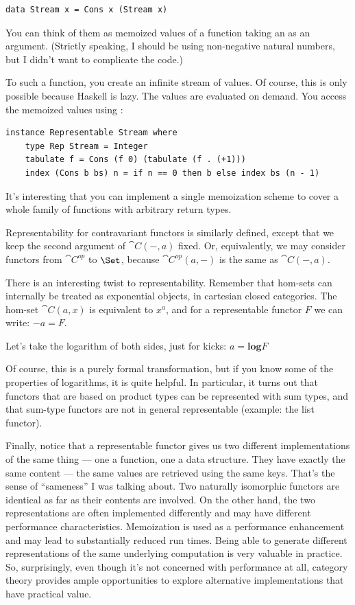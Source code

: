 \begin{Verbatim}
data Stream x = Cons x (Stream x)
\end{Verbatim}
You can think of them as memoized values of a function taking an
 as an argument. (Strictly speaking, I should be using
non-negative natural numbers, but I didn't want to complicate the code.)

To  such a function, you create an infinite stream of
values. Of course, this is only possible because Haskell is lazy. The
values are evaluated on demand. You access the memoized values using
:

\begin{Verbatim}
instance Representable Stream where
    type Rep Stream = Integer
    tabulate f = Cons (f 0) (tabulate (f . (+1)))
    index (Cons b bs) n = if n == 0 then b else index bs (n - 1)
\end{Verbatim}
It's interesting that you can implement a single memoization scheme to
cover a whole family of functions with arbitrary return types.

Representability for contravariant functors is similarly defined, except
that we keep the second argument of $\cat{C}(-, a)$ fixed. Or,
equivalently, we may consider functors from $\cat{C}^{op}$
to $\Set$, because $\cat{C}^{op}(a, -)$ is the same as
$\cat{C}(-, a)$.

There is an interesting twist to representability. Remember that
hom-sets can internally be treated as exponential objects, in cartesian
closed categories. The hom-set $\cat{C}(a, x)$ is equivalent to
$x^a$, and for a representable functor $F$ we can write: $-a = F$.

Let's take the logarithm of both sides, just for kicks: $a = \mathbf{log}F$

Of course, this is a purely formal transformation, but if you know some
of the properties of logarithms, it is quite helpful. In particular, it
turns out that functors that are based on product types can be
represented with sum types, and that sum-type functors are not in
general representable (example: the list functor).

Finally, notice that a representable functor gives us two different
implementations of the same thing --- one a function, one a data
structure. They have exactly the same content --- the same values are
retrieved using the same keys. That's the sense of ``sameness'' I was
talking about. Two naturally isomorphic functors are identical as far as
their contents are involved. On the other hand, the two representations
are often implemented differently and may have different performance
characteristics. Memoization is used as a performance enhancement and
may lead to substantially reduced run times. Being able to generate
different representations of the same underlying computation is very
valuable in practice. So, surprisingly, even though it's not concerned
with performance at all, category theory provides ample opportunities to
explore alternative implementations that have practical value.

